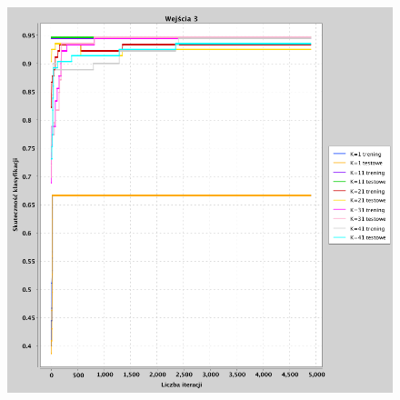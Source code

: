 \documentclass[a4paper, portrait,11pt]{article}
\begin{document}
\begin{figure}[!htb]
\begin{minipage}{0.33\textwidth}
    \caption{\label{fig:41_1_2}}
  \end{minipage}
  \begin{minipage}{0.33\textwidth}
    \centering
    \includegraphics[width=1\linewidth]{../data/classification4/1/1_3.png}
    \caption{\label{fig:41_1_3}}
  \end{minipage}\hfill
\end{figure}
\end{document}
